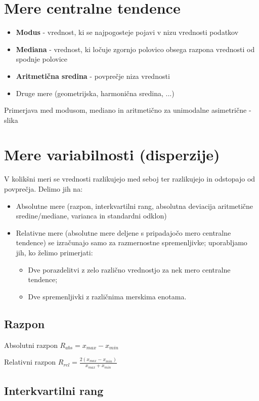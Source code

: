 \section{Mere centralne tendence}
\begin{itemize}
    \item \textbf{Modus} - vrednost, ki se najpogosteje pojavi v nizu vrednosti podatkov
    \item \textbf{Mediana} - vrednost, ki ločuje zgornjo polovico obsega razpona vrednosti od spodnje polovice
    \item \textbf{Aritmetična sredina} - povprečje niza vrednosti
    \item Druge mere (geometrijska, harmonična sredina, ...)
\end{itemize}
Primerjava med modusom, mediano in aritmetično za unimodalne asimetrične - slika

\section{Mere variabilnosti (disperzije)}
V kolikšni meri se vrednosti razlikujejo med seboj ter razlikujejo in odstopajo od povprečja. Delimo jih na:
\begin{itemize}
    \item Absolutne mere (razpon, interkvartilni rang, absolutna deviacija aritmetične sredine/mediane, varianca in standardni odklon) 
    \item Relativne mere (absolutne mere deljene s pripadajočo mero centralne tendence) se izračunajo samo za razmernostne spremenljivke; uporabljamo jih, ko želimo primerjati:
    \begin{itemize}
        \item Dve porazdelitvi z zelo različno vrednostjo za nek mero centralne tendence;
        \item Dve spremenljivki z različnima merskima enotama.
    \end{itemize}
\end{itemize}

\subsection*{Razpon}

Absolutni razpon $R_{abs}=x_{max}-x_{min}$

Relativni razpon $R_{rel}=\frac{2\left(x_{max}-x_{min}\right)}{x_{max}+x_{min}}$

\subsection*{Interkvartilni rang}


